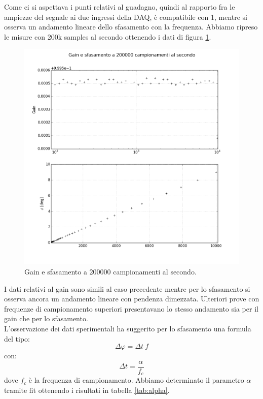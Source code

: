 \documentclass[journal, a4paper]{IEEEtran}
\begin{document}
Come ci si aspettava i punti relativi al guadagno, quindi al rapporto fra le ampiezze del segnale ai due ingressi della DAQ, è compatibile con 1, mentre si osserva un andamento lineare dello sfasamento con la frequenza. Abbiamo ripreso le misure con 200k samples al secondo ottenendo i dati di figura \ref{fig:ampli200000}. 

\begin{figure}[htp]
\centering
\includegraphics[scale=.3]{subplots_errors_amplitude200000}
\caption{Gain e sfasamento a 200000 campionamenti al secondo.}
\label{fig:ampli200000}
\end{figure}

I dati relativi al gain sono simili al caso precedente mentre per lo sfasamento si osserva ancora un andamento lineare con pendenza dimezzata. Ulteriori prove con frequenze di campionamento superiori presentavano lo stesso andamento sia per il gain che per lo sfasamento.\\
L'osservazione dei dati sperimentali ha suggerito per lo sfasamento una formula del tipo:
\begin{equation}
\Delta \varphi  = \Delta t ~ f
\end{equation}
con:
\begin{equation}
\Delta t = \frac{\alpha}{f_c}
\end{equation}
dove $f_c$ è la frequenza di campionamento. Abbiamo determinato il parametro $\alpha$ tramite fit ottenendo i risultati in tabella \ref{tab:alpha}.\\
\end{document}
